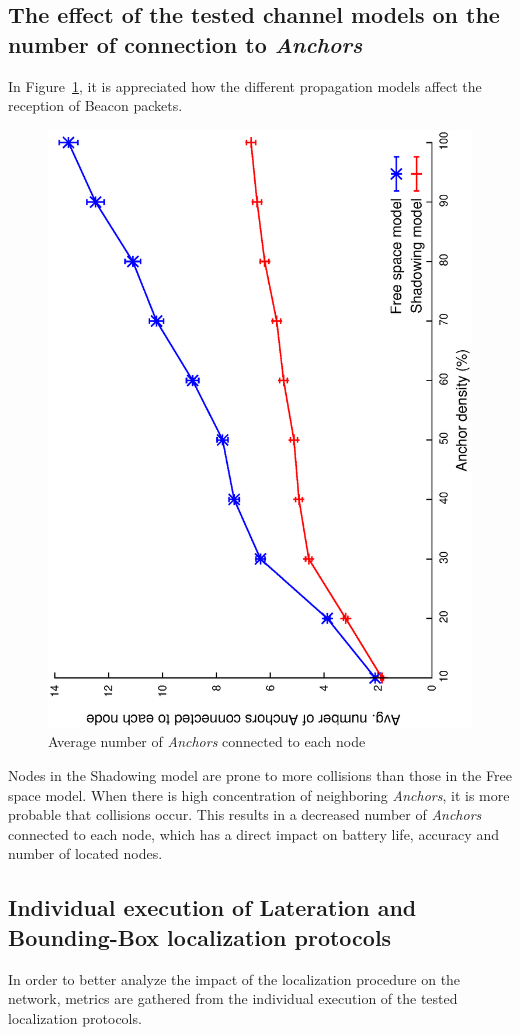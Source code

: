 \subsection{The effect of the tested channel models on the number of connection to \emph{Anchors}}\label{channel_considerations}
In Figure~\ref{fig:channelAndBeacons}, it is appreciated how the different propagation models affect the reception of Beacon packets.

\begin{figure}[htbp]
  \centering
  \includegraphics[width=0.7\linewidth, angle = -90]{section4/figures/avgBeaconPerNode.eps}
  \caption{Average number of \emph{Anchors} connected to each node}
  \label{fig:channelAndBeacons}
\end{figure}

Nodes in the Shadowing model are prone to more collisions than those in the Free space model. When there is high concentration of neighboring \emph{Anchors}, it is more probable that collisions occur. This results in a decreased number of \emph{Anchors} connected to each node, which has a direct impact on battery life, accuracy and number of located nodes.

\subsection{Individual execution of Lateration and Bounding-Box localization protocols}\label{individual_execution}
In order to better analyze the impact of the localization procedure on the network, metrics are gathered from the individual execution of the tested localization protocols.

